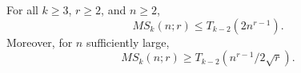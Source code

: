 \begin{theorem}\label{MS}
    For all $k \geq 3$, $r \geq 2$, and $n \geq 2$,
    \begin{equation*}
        MS_k(n; r) \leq T_{k-2}(2 n^{r-1}).
    \end{equation*}
    Moreover, for $n$ sufficiently large,
    \begin{equation*}
        MS_k(n; r) \geq T_{k-2}(n^{r-1} / 2 \sqrt{r}).
    \end{equation*}
\end{theorem}

